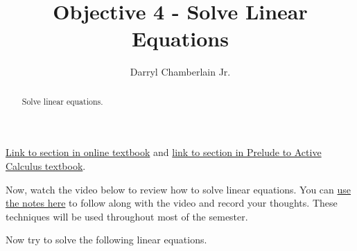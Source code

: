\documentclass{ximera}
\author{Darryl Chamberlain Jr.}
\title{Objective 4 - Solve Linear Equations}
\begin{document}
\begin{abstract}
Solve linear equations. 
\end{abstract}
\maketitle

\href{https://cnx.org/contents/mwjClAV_@8.1:62_eXnY6@14/Linear-Equations-in-One-Variable}{Link to section in online textbook} and 
\href{https://activecalculus.org/prelude/sec-changing-linear.html}{link to section in Prelude to Active Calculus textbook}.


Now, watch the video below to review how to solve linear equations. You can \href{http://people.clas.ufl.edu/dchamberlain31/files/Objective-4-Solving-Linear-Equations.pdf}{use the notes here} to follow along with the video and record your thoughts. These techniques will be used throughout most of the semester. 


Now try to solve the following linear equations. 
\end{document}
